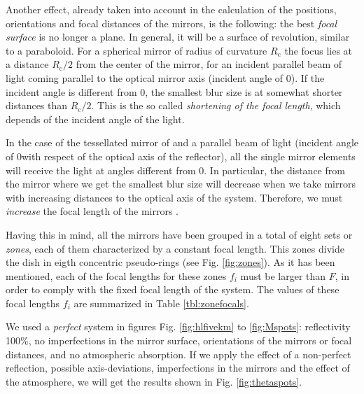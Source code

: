 Another effect, already taken into account in the calculation of the
positions, orientations and focal distances of the mirrors, is the
following: the best \emph{focal surface} is no longer a plane. In
general, it will be a surface of revolution, similar to a paraboloid.
For a spherical mirror of radius of curvature $R_{\mathrm{c}}$ the
focus lies at a distance $R_{\mathrm{c}}/2$ from the center of the
mirror, for an incident parallel beam of light coming parallel to the
optical mirror axis (incident angle of 0\deg).  If the incident angle
is different from 0\deg, the smallest blur size is at somewhat shorter
distances than $R_{\mathrm{c}}/2$. This is the so called
\emph{shortening of the focal length}, which depends of the incident
angle of the light.

\label{circular_cite} %

In the case of the tessellated mirror of \MAGIC and a parallel beam of
light (incident angle of 0\deg with respect of the optical axis of the
reflector), all the single mirror elements will receive the light at
angles different from 0\deg. In particular, the distance from the
mirror where we get the smallest blur size will decrease when we take
mirrors with increasing distances to the optical axis of the system.
Therefore, we must \emph{increase} the focal length of the mirrors%
.

Having this in mind, all the mirrors have been grouped in a total of
eight sets or \emph{zones}, each of them characterized by a constant
focal length. This zones divide the dish in eigth concentric
pseudo-rings (see Fig. \ref{fig:zones}). As it has been mentioned,
each of the focal lengths for these zones $f_i$ must be larger than
$F$, in order to comply with the fixed focal length of the system. The
values of these focal lengths $f_i$ are summarized in Table
\ref{tbl:zonefocals}.

\zonefocalstbl

\thetaspotsfig

\afterpage{\clearpage}

We used a \emph{perfect} system in figures Fig. \ref{fig:hlfivekm} to
\ref{fig:Mspots}: reflectivity 100\%, no imperfections in the mirror
surface, orientations of the mirrors or focal distances, and no
atmospheric absorption. If we apply the effect of a non-perfect
reflection, possible axis-deviations, imperfections in the mirrors and
the effect of the atmosphere, we will get the results shown in Fig.
\ref{fig:thetaspots}.

